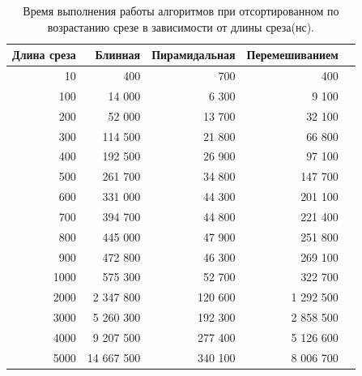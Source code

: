 
\begin{table}[!ht]
    \centering
    \caption{\label{tab:tableAsc} Время выполнения работы алгоритмов при отсортированном по возрастанию срезе
    в зависимости от длины среза(нс).}
    \begin{tabular}{|r|r|r|r|r|}
    \hline
        Длина среза & Блинная & Пирамидальная & Перемешиванием   \\ \hline
        10 & 400 & 700 & 400   \\ \hline
        100 & 14 000 & 6 300 & 9 100   \\ \hline
        200 & 52 000 & 13 700 & 32 100   \\ \hline
        300 & 114 500 & 21 800 & 66 800   \\ \hline
        400 & 192 500 & 26 900 & 97 100   \\ \hline
        500 & 261 700 & 34 800 & 147 700   \\ \hline
        600 & 331 000 & 44 300 & 201 100   \\ \hline
        700 & 394 700 & 44 800 & 221 400   \\ \hline
        800 & 445 000 & 47 900 & 251 800   \\ \hline
        900 & 472 800 & 46 300 & 269 100   \\ \hline
        1000 & 575 300 & 52 700 & 322 700   \\ \hline
        2000 & 2 347 800 & 120 600 & 1 292 500   \\ \hline
        3000 & 5 260 300 & 192 300 & 2 858 500   \\ \hline
        4000 & 9 207 500 & 277 400 & 5 126 600   \\ \hline
        5000 & 14 667 500 & 340 100 & 8 006 700  \\ \hline
    \end{tabular}
\end{table}


